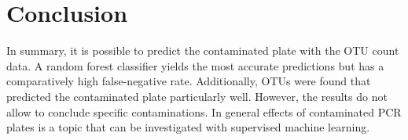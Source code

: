 \documentclass{svproc}
\begin{document}
%
%
\section{Conclusion}
%
In summary, it is possible to predict the contaminated plate with the OTU count data. A random forest classifier yields the most accurate predictions but has a comparatively high false-negative rate. Additionally, OTUs were found that predicted the contaminated plate particularly well. However, the results do not allow to conclude specific contaminations. In general effects of contaminated PCR plates is a topic that can be investigated with supervised machine learning.


%
%
%


\end{document}
